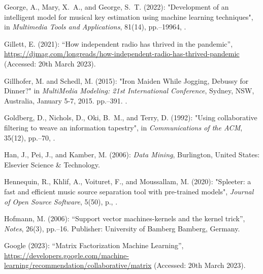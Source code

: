 \documentclass[11pt,titlepage,oneside]{book}
\begin{document}
\begin{thebibliography}{97}
	George, A., Mary, X.~A., and George, S.~T. (2022): "Development of an
		intelligent model for musical key estimation using machine learning
		techniques", in \textit{Multimedia Tools and Applications}, 81(14),
	pp.--19964, .
	
	Gillett, E. (2021): \enquote{How independent radio has thrived in the pandemic},
	\urlprefix\url{https://djmag.com/longreads/how-independent-radio-has-thrived-pandemic} (Accessed: 20th March 2023).
	
	Gillhofer, M. and Schedl, M. (2015): "Iron {Maiden} {While} {Jogging},
		{Debussy} for {Dinner}?" in \textit{MultiMedia Modeling: 21st International Conference}, Sydney, NSW, Australia, January 5-7, 2015. pp.--391. .
	
	Goldberg, D., Nichols, D., Oki, B.~M., and Terry, D. (1992): "Using
		collaborative filtering to weave an information tapestry", in
	\textit{Communications of the ACM}, 35(12), pp.--70,
	.
	
	Han, J., Pei, J., and Kamber, M. (2006): \textit{Data {Mining}}, Burlington, United States: Elsevier Science \& Technology.
	
	Hennequin, R., Khlif, A., Voituret, F., and Moussallam, M. (2020):
	"Spleeter: a fast and efficient music source separation tool with
		pre-trained models", \textit{Journal of Open Source Software}, 5(50),
	p., .
	
	Hofmann, M. (2006): \enquote{Support vector machines-kernels and the kernel
		trick}, \textit{Notes}, 26(3), pp.--16. Publisher: University
	of Bamberg Bamberg, Germany.
	
	Google (2023): \enquote{Matrix {Factorization}
		{\textbar} {Machine} {Learning}},
	\urlprefix\url{https://developers.google.com/machine-learning/recommendation/collaborative/matrix} (Accessed: 20th March 2023).
	

\end{thebibliography}
\end{document}
